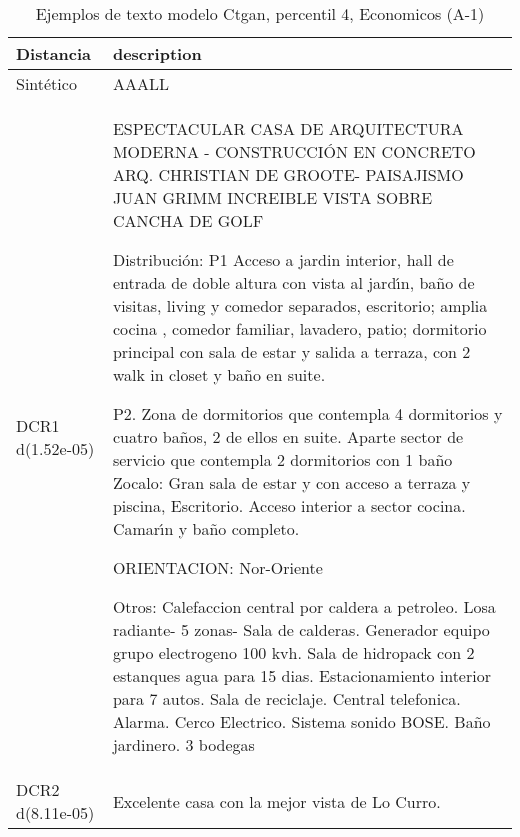 \begin{table}[H]
\centering
\fontsize{10}{14}\selectfont
\caption{Ejemplos de texto modelo Ctgan, percentil 4, Economicos (A-1)}
\label{table-example-economicos-a-1-ctgan-4p-text}
\begin{tabular}{|l|m{35em}|}
\hline
\rowcolor[gray]{0.8}
Distancia & description \\
\hline Sintético & AAALL \\
\hline DCR1 d(1.52e-05) & ESPECTACULAR CASA DE ARQUITECTURA MODERNA - 
CONSTRUCCI\'ON EN CONCRETO
ARQ. CHRISTIAN DE GROOTE- PAISAJISMO JUAN GRIMM
INCREIBLE VISTA SOBRE CANCHA DE GOLF

Distribuci\'on:
P1 Acceso a jardin interior, hall de entrada de doble altura con vista al jard{\'\i}n,  ba\~no de visitas, living y comedor  separados, escritorio; amplia cocina , comedor familiar, lavadero, patio; dormitorio principal con sala de  estar y salida a terraza, con  2 walk in closet y ba\~no en suite.

P2. Zona de dormitorios que contempla 4 dormitorios y cuatro ba\~nos, 2 de ellos en suite. Aparte sector de servicio que contempla 2 dormitorios con 1 ba\~no
Zocalo: Gran sala de estar  y con acceso a terraza y piscina, Escritorio.   Acceso interior a sector cocina. Camar{\'\i}n y ba\~no completo.

ORIENTACION: Nor-Oriente

Otros:
Calefaccion central por caldera a petroleo. Losa radiante- 5 zonas- Sala de calderas.  Generador equipo grupo electrogeno 100 kvh. Sala de hidropack con 2 estanques agua para 15 dias. Estacionamiento interior para 7 autos. Sala de reciclaje. Central telefonica. Alarma. Cerco Electrico. Sistema sonido BOSE.
Ba\~no jardinero. 3 bodegas \\
\hline DCR2 d(8.11e-05) & Excelente casa con la mejor vista de Lo Curro. \\
\hline
\end{tabular}
\end{table}
